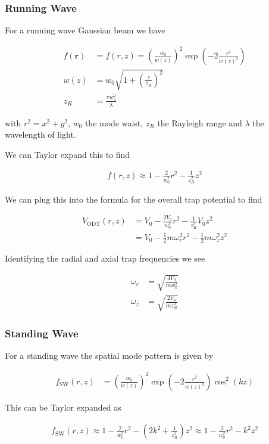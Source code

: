 \documentclass[12pt]{article}
\newcommand{\bv}[1]{\boldsymbol{#1}}
\begin{document}
\subsubsection{Running Wave}
For a running wave Gaussian beam we have

\begin{align}
f(\bv{r}) &=  f(r,z) = \left(\frac{w_0}{w(z)}\right)^2 \exp\left(-2\frac{r^2}{w(z)^2}\right)\\
w(z) &= w_0\sqrt{1+\left(\frac{z}{z_R}\right)^2}\\
z_R & = \frac{\pi w_0^2}{\lambda}
\end{align} 

with $r^2 = x^2+ y^2$, $w_0$ the mode waist, $z_R$ the Rayleigh range and $\lambda$ the wavelength of light.

We can Taylor expand this to find

\begin{align}
f(r,z) \approx 1 - \frac{2}{w_0^2}r^2 - \frac{1}{z_R^2} z^2
\end{align}

We can plug this into the formula for the overall trap potential to find

\begin{align}
V_{\text{ODT}}(r,z) &= V_0 - \frac{2V_0}{w_0^2}r^2 - \frac{1}{z_R^2} V_0 z^2\\
&= V_0 - \frac{1}{2} m \omega_r^2 r^2 - \frac{1}{2} m \omega_z^2 z^2
\end{align}

Identifying the radial and axial trap frequencies we see

\begin{align}
\omega_r &= \sqrt{\frac{4V_0}{mw_0^2}}\\
\omega_z &= \sqrt{\frac{2V_0}{mz_R^2}}
\end{align}

\subsubsection{Standing Wave}
For a standing wave the spatial mode pattern is given by

\begin{align}
f_{\text{SW}}(r,z) &= \left(\frac{w_0}{w(z)}\right)^2\exp\left(-2\frac{r^2}{w(z)^2}\right)\cos^2\left(k z\right)
\end{align}

This can be Taylor expanded as

\begin{align}
f_{\text{SW}}(r,z) \approx 1 - \frac{2}{w_0^2} r^2 - \left(2k^2 + \frac{1}{z_R^2} \right)z^2 \approx1 - \frac{2}{w_0^2} r^2 - k^2z^2 
\end{align}
\end{document}

